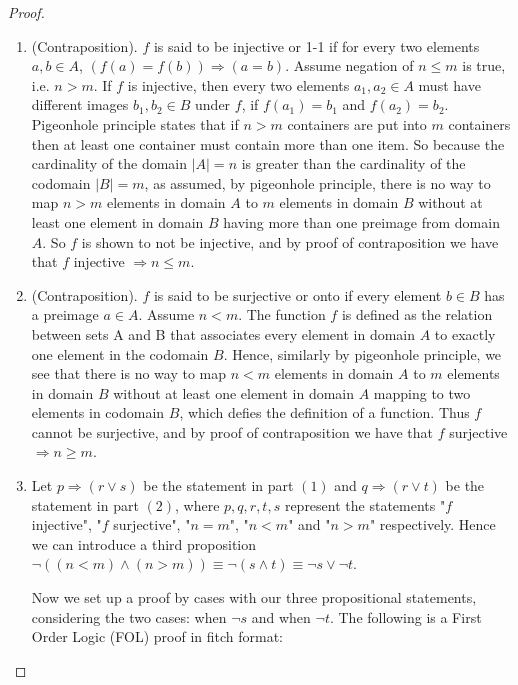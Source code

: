 \documentclass[11pt,twoside, reqno, align]{amsart}
\theoremstyle{remark}
\newcommand{\OR}{\vee}
\newcommand{\AND}{\wedge}
\renewcommand{\implies}{\Rightarrow}
\begin{document}
\begin{proof}
\begin{enumerate}
    \item (Contraposition). $f$ is said to be injective or 1-1 if for every two elements $a,b \in A$, $(f(a) = f(b)) \implies (a = b)$. Assume negation of $n \leq m$ is true, i.e. $n > m$. If $f$ is injective, then every two elements $a_1,a_2 \in A$ must have different images $b_1,b_2 \in B$ under $f$, if $f(a_1) = b_1$ and $f(a_2) = b_2$. Pigeonhole principle states that if $n > m$ containers are put into $m$ containers then at least one container must contain more than one item. So because the cardinality of the domain $|A| = n$ is greater than the cardinality of the codomain $|B| = m$, as assumed, by pigeonhole principle, there is no way to map $n > m$ elements in domain $A$ to $m$ elements in domain $B$ without at least one element in domain $B$ having more than one preimage from domain $A$. So $f$ is shown to not be injective, and by proof of contraposition we have that $f$ injective $\implies n \leq m$. 
    \\
    \item (Contraposition). $f$ is said to be surjective or onto if every element $b \in B$ has a preimage $a \in A$. Assume $n < m$. The function $f$ is defined as the relation between sets A and B that associates every element in domain $A$ to exactly one element in the codomain $B$. Hence, similarly by pigeonhole principle, we see that there is no way to map $n < m$ elements in domain $A$ to $m$ elements in domain $B$ without at least one element in domain $A$ mapping to two elements in codomain $B$, which defies the definition of a function. Thus $f$ cannot be surjective, and by proof of contraposition we have that $f$ surjective $\implies n \geq m$.
    \\
    \item Let $p \implies (r \OR s)$ be the statement in part $(1)$ and $q \implies (r \OR t)$ be the statement in part $(2)$, where $p, q, r, t, s$ represent the statements "$f$ injective", "$f$ surjective", "$n = m$", "$n < m$" and "$n > m$" respectively. Hence we can introduce a third proposition $\neg ((n < m)\AND(n > m)) \equiv \neg (s \AND t) \equiv \neg s \OR \neg t$.
    
    Now we set up a proof by cases with our three propositional statements, considering the two cases: when $\neg s$ and when $\neg t$. The following is a First Order Logic (FOL) proof in fitch format:
    

\end{enumerate}
\end{proof}
\end{document}
